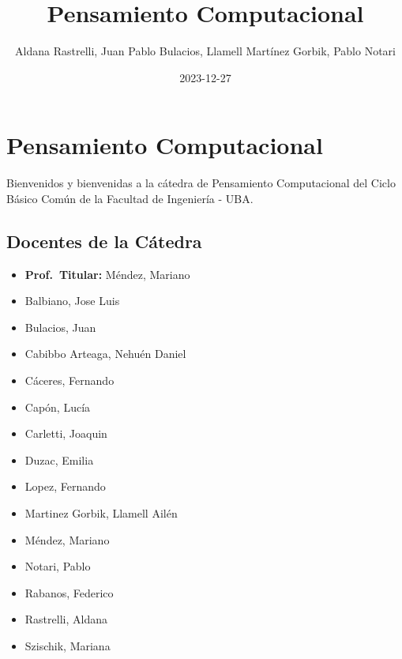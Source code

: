 \documentclass[
  letterpaper,
  DIV=11,
  numbers=noendperiod]{scrreprt}
\title{Pensamiento Computacional}
\author{Aldana Rastrelli, Juan Pablo Bulacios, Llamell Martínez Gorbik,
Pablo Notari}
\date{2023-12-27}
\renewcommand*\contentsname{Table of contents}
\newcommand\contentsname{Table of contents}
\begin{document}
\maketitle

\renewcommand*\contentsname{Table of contents}
{
\hypersetup{linkcolor=}
\setcounter{tocdepth}{2}
\tableofcontents
}

\chapter*{Pensamiento Computacional}\label{pensamiento-computacional}


Bienvenidos y bienvenidas a la cátedra de Pensamiento Computacional del
Ciclo Básico Común de la Facultad de Ingeniería - UBA.

\section*{Docentes de la Cátedra}\label{docentes-de-la-cuxe1tedra}


\begin{itemize}
\item
  \textbf{Prof.~Titular:} Méndez, Mariano
\item
  Balbiano, Jose Luis
\item
  Bulacios, Juan
\item
  Cabibbo Arteaga, Nehuén Daniel
\item
  Cáceres, Fernando
\item
  Capón, Lucía
\item
  Carletti, Joaquin
\item
  Duzac, Emilia
\item
  Lopez, Fernando
\item
  Martinez Gorbik, Llamell Ailén
\item
  Méndez, Mariano
\item
  Notari, Pablo
\item
  Rabanos, Federico
\item
  Rastrelli, Aldana
\item
  Szischik, Mariana
\end{itemize}

\end{document}

